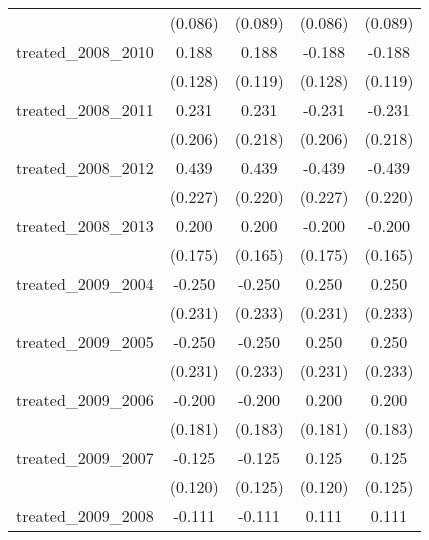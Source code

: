 {\begin{tabular}{l*{4}{c}}
            &     (0.086)         &     (0.089)         &     (0.086)         &     (0.089)         \\
[1em]
treated\_2008\_2010&       0.188         &       0.188         &      -0.188         &      -0.188         \\
            &     (0.128)         &     (0.119)         &     (0.128)         &     (0.119)         \\
[1em]
treated\_2008\_2011&       0.231         &       0.231         &      -0.231         &      -0.231         \\
            &     (0.206)         &     (0.218)         &     (0.206)         &     (0.218)         \\
[1em]
treated\_2008\_2012&       0.439         &       0.439\sym{*}  &      -0.439         &      -0.439\sym{*}  \\
            &     (0.227)         &     (0.220)         &     (0.227)         &     (0.220)         \\
[1em]
treated\_2008\_2013&       0.200         &       0.200         &      -0.200         &      -0.200         \\
            &     (0.175)         &     (0.165)         &     (0.175)         &     (0.165)         \\
[1em]
treated\_2009\_2004&      -0.250         &      -0.250         &       0.250         &       0.250         \\
            &     (0.231)         &     (0.233)         &     (0.231)         &     (0.233)         \\
[1em]
treated\_2009\_2005&      -0.250         &      -0.250         &       0.250         &       0.250         \\
            &     (0.231)         &     (0.233)         &     (0.231)         &     (0.233)         \\
[1em]
treated\_2009\_2006&      -0.200         &      -0.200         &       0.200         &       0.200         \\
            &     (0.181)         &     (0.183)         &     (0.181)         &     (0.183)         \\
[1em]
treated\_2009\_2007&      -0.125         &      -0.125         &       0.125         &       0.125         \\
            &     (0.120)         &     (0.125)         &     (0.120)         &     (0.125)         \\
[1em]
treated\_2009\_2008&      -0.111         &      -0.111         &       0.111         &       0.111         \\

\end{tabular}}
